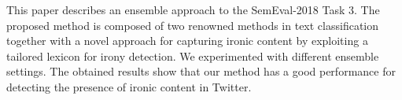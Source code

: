 This paper describes an ensemble approach to the SemEval-2018 Task 3. The proposed method is composed of two renowned methods in text classification together with a novel approach for capturing ironic content by exploiting a tailored lexicon for irony detection. We experimented with different ensemble settings. The obtained results show that our method has a good performance for detecting the presence of ironic content in Twitter.
